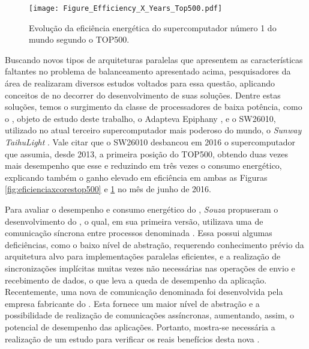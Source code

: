 \begin{figure}[tb]
  \centering
  \caption{Evolução da eficiência energética do supercomputador número 1 do mundo segundo o \ranking TOP500.}
  \label{fig:eficienciaxyearstop500}
  \texttt{[image: Figure\_Efficiency\_X\_Years\_Top500.pdf]}
\end{figure}

Buscando novos tipos de arquiteturas paralelas que apresentem as características faltantes no problema de balanceamento apresentado acima, pesquisadores da área de \textit{\HPC} realizaram diversos estudos voltados para essa questão, aplicando conceitos de \greencomputing \cite{greencomputingacm} no decorrer do desenvolvimento de suas soluções. Dentre estas soluções, temos o surgimento da classe de processadores \manycore de baixa potência, como o \mppa \cite{mppa2562013}, objeto de estudo deste trabalho, o Adapteva Epiphany \cite{olofsson2014}, e o SW26010, utilizado no atual terceiro supercomputador mais poderoso do mundo, o \textit{Sunway TaihuLight} \cite{fu2016sunway}. Vale citar que o SW26010 desbancou em 2016 o supercomputador que assumia, desde 2013, a primeira posição do \ranking TOP500, obtendo duas vezes mais desempenho que esse e reduzindo em três vezes o consumo energético, explicando também o ganho elevado em eficiência em ambas as Figuras \ref{fig:eficienciaxcorestop500} e \ref{fig:eficienciaxyearstop500} no mês de junho de 2016.

Para avaliar o desempenho e consumo energético do \mppa, \textit{Souza} \etal \cite{Castro-Souza-CCPE:2016} propuseram o desenvolvimento do \bench \capb, o qual, em sua primeira versão, utilizava uma \textit{\API} de comunicação síncrona entre processos denominada \textit{\IPC} \cite{mppa2562013}. Essa \API possui algumas deficiências, como o baixo nível de abstração, requerendo conhecimento prévio da arquitetura alvo para implementações paralelas eficientes, e a realização de sincronizações implícitas muitas vezes não necessárias nas operações de envio e recebimento de dados, o que leva a queda de desempenho da aplicação. Recentemente, uma nova \API de comunicação denominada \textit{\ASYNC} foi desenvolvida pela empresa fabricante do  \mppa. Esta \API fornece um maior nível de abstração e a possibilidade de realização de comunicações assíncronas, aumentando, assim, o potencial de desempenho das aplicações. Portanto, mostra-se necessária a realização de um estudo para verificar os reais benefícios desta nova \API.

